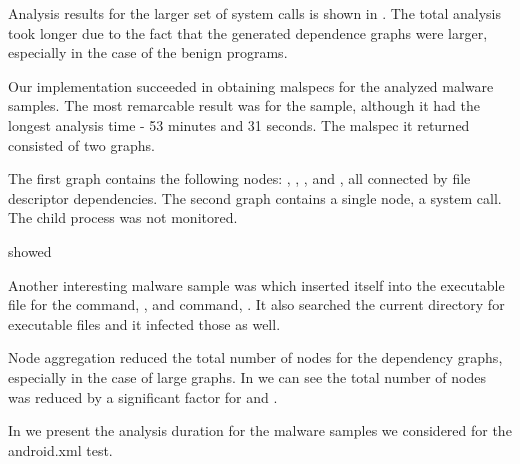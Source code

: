 Analysis results for the larger set of system calls is shown in . The total analysis took longer due to the fact that the generated dependence graphs were larger, especially in the case of the benign programs.

Our implementation succeeded in obtaining malspecs for the analyzed malware samples. The most remarcable result was for the  sample, although it had the longest analysis time - 53 minutes and 31 seconds. The malspec it returned consisted of two graphs.

The first graph contains the following nodes: , , ,  and , all connected by file descriptor dependencies. The second graph contains a single node, a  system call. The child process was not monitored.

 showed 

Another interesting malware sample was  which inserted itself into the executable file for the  command, , and  command, . It also searched the current directory for executable files and it infected those as well.

Node aggregation reduced the total number of nodes for the dependency graphs, especially in the case of large graphs. In  we can see the total number of nodes was reduced by a significant factor for  and .


In  we present the analysis duration for the malware samples we considered for the android.xml test.

\makeatletter \setlength{\@fptop}{0pt} \makeatother

